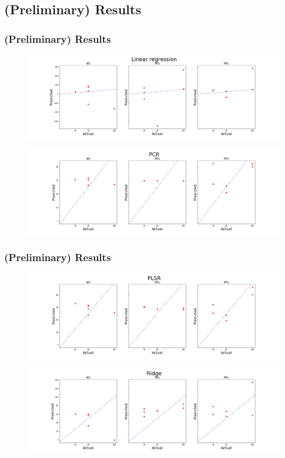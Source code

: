\documentclass{beamer}
\begin{document}
\begin{frame}
	\section{(Preliminary) Results}
	\frametitle{(Preliminary) Results}
	
	\begin{figure}[!htb]
		\centering
		\includegraphics[width=1\textwidth]{../../figures/lr_plot.png}
	\end{figure} 

\begin{figure}[!htb]
	\centering
	\includegraphics[width=1\textwidth]{../../figures/pcr_plot.png}
\end{figure}
\end{frame}

\begin{frame}
	\frametitle{(Preliminary) Results}
	
	\begin{figure}[!htb]
		\centering
		\includegraphics[width=1\textwidth]{../../figures/plsr_plot.png}
	\end{figure} 
	
	\begin{figure}[!htb]
		\centering
		\includegraphics[width=1\textwidth]{../../figures/ridge_plot.png}
	\end{figure}
\end{frame}
\end{document}
